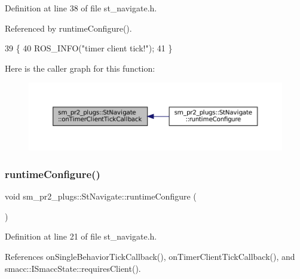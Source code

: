 Definition at line 38 of file st\+\_\+navigate.\+h.



Referenced by runtime\+Configure().


\begin{DoxyCode}
39     \{
40         ROS\_INFO(\textcolor{stringliteral}{"timer client tick!"});
41     \}
\end{DoxyCode}
Here is the caller graph for this function\+:
\nopagebreak
\begin{figure}[H]
\begin{center}
\leavevmode
\includegraphics[width=350pt]{structsm__pr2__plugs_1_1StNavigate_a6340d786397971eff5772816cdf7affc_icgraph}
\end{center}
\end{figure}
\mbox{\label{structsm__pr2__plugs_1_1StNavigate_ae7ab6b7fda6772eb50c512da21085cc0}} 
\subsubsection{\texorpdfstring{runtime\+Configure()}{runtimeConfigure()}}
{\footnotesize\ttfamily void sm\+\_\+pr2\+\_\+plugs\+::\+St\+Navigate\+::runtime\+Configure (\begin{DoxyParamCaption}{ }\end{DoxyParamCaption})\hspace{0.3cm}{\ttfamily [inline]}}



Definition at line 21 of file st\+\_\+navigate.\+h.



References on\+Single\+Behavior\+Tick\+Callback(), on\+Timer\+Client\+Tick\+Callback(), and smacc\+::\+I\+Smacc\+State\+::requires\+Client().


